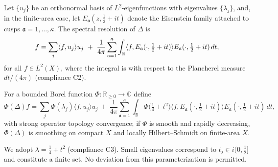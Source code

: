 \begin{definition}\relax\hspace{0pt}
\label{def:tfc1-resolution} %
Let $\{u_j\}$ be an orthonormal basis of $L^2$-eigenfunctions with eigenvalues $\{\lambda_j\}$, and, in the finite-area case, let $E_{\mathfrak{a}}(z,\tfrac12+it)$ denote the Eisenstein family attached to cusps $\mathfrak{a}=1,\dots,\kappa$. The spectral resolution of $\Delta$ is
\begin{equation}\relax\hspace{0pt}
\label{eq:tfc1-res}\relax\hspace{0pt}
f=\sum_{j}\langle f,u_j\rangle u_j\ +\ \frac{1}{4\pi}\sum_{\mathfrak{a}=1}^{\kappa}\int_{\mathbb{R}}\langle f,E_{\mathfrak{a}}(\cdot,\tfrac12+it)\rangle E_{\mathfrak{a}}(\cdot,\tfrac12+it)\,dt,
\end{equation}
for all $f\in L^2(X)$, where the integral is with respect to the Plancherel measure $dt/(4\pi)$ (compliance C2).\relax\hspace{0pt}
\end{definition}

\begin{definition}\relax\hspace{0pt}
\label{def:tfc1-fcalc} %
For a bounded Borel function $\Phi:\mathbb{R}_{\ge0}\to\mathbb{C}$ define
\[
\Phi(\Delta)f=\sum_{j}\Phi(\lambda_j)\langle f,u_j\rangle u_j\ +\ \frac{1}{4\pi}\sum_{\mathfrak{a}=1}^{\kappa}\int_{\mathbb{R}}\Phi\!\big(\tfrac14+t^2\big)\langle f,E_{\mathfrak{a}}(\cdot,\tfrac12+it)\rangle E_{\mathfrak{a}}(\cdot,\tfrac12+it)\,dt,
\]
with strong operator topology convergence; if $\Phi$ is smooth and rapidly decreasing, $\Phi(\Delta)$ is smoothing on compact $X$ and locally Hilbert--Schmidt on finite-area $X$.\relax\hspace{0pt}
\end{definition}

\begin{remark}\relax\hspace{0pt}
\label{rem:tfc1-param} %
We adopt $\lambda=\tfrac14+t^2$ (compliance C3). Small eigenvalues correspond to $t_j\in i(0,\tfrac12]$ and constitute a finite set. No deviation from this parameterization is permitted.\relax\hspace{0pt}
\end{remark}

